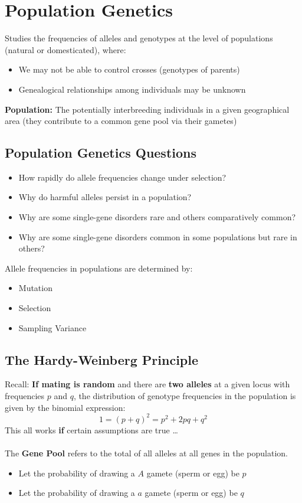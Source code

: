 \documentclass[10pt]{article}
\begin{document}
\section*{Population Genetics}
Studies the frequencies of alleles and genotypes at the level of populations (natural or domesticated), where:
\begin{itemize}
	\item We may not be able to control crosses (genotypes of parents)
	\item Genealogical relationships among individuals may be unknown
\end{itemize}
\textbf{Population:} The potentially interbreeding individuals in a given geographical area (they contribute to a common gene pool via their gametes)

\subsection*{Population Genetics Questions}
\begin{itemize}
	\item How rapidly do allele frequencies change under selection?
	\item Why do harmful alleles persist in a population?
	\item Why are some single-gene disorders rare and others comparatively common?
	\item Why are some single-gene disorders common in some populations but rare in others?
\end{itemize}
Allele frequencies in populations are determined by:
\begin{itemize}
	\item Mutation
	\item Selection
	\item Sampling Variance
\end{itemize}

\subsection*{The Hardy-Weinberg Principle}
Recall: \textbf{If mating is random} and there are \textbf{two alleles} at a given locus with frequencies $p$ and $q$, the distribution of genotype frequencies in the population is given by the binomial expression:
\[1 = (p + q)^2 = p^2 + 2pq + q^2\]
This all works \textbf{if} certain assumptions are true \dots\\\\
The \textbf{Gene Pool} refers to the total of all alleles at all genes in the population.
\begin{itemize}
	\item Let the probability of drawing a $A$ gamete (sperm or egg) be $p$
	\item Let the probability of drawing a $a$ gamete (sperm or egg) be $q$
\end{itemize}
\end{document}
